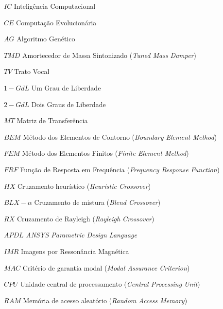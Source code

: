 \begin{siglas}
	\item[$IC$] 	Inteligência Computacional
	\item[$CE$] 	Computação Evolucionária
	\item[$AG$] 	Algoritmo Genético
	\item[$TMD$]	Amortecedor de Massa Sintonizado (\textit{Tuned Mass Damper})
	\item[$TV$]		Trato Vocal
	\item[$1-GdL$]  Um Grau de Liberdade
	\item[$2-GdL$]  Dois Graus de Liberdade
	\item[$MT$] 	Matriz de Transferência
	\item[$BEM$] 	Método dos Elementos de Contorno  (\textit{Boundary Element Method})
	\item[$FEM$] 	Método dos Elementos Finitos (\textit{Finite Element Method})
	\item[$FRF$] 	Função de Resposta em Frequência (\textit{Frequency Response Function})
	\item[$HX$]		Cruzamento heurístico (\textit{Heuristic Crossover})
	\item[$BLX-\alpha$]	Cruzamento de mistura (\textit{Blend Crossover})
	\item[$RX$]		Cruzamento de Rayleigh (\textit{Rayleigh Crossover})
	\item[$APDL$] 	\textit{ANSYS Parametric Design Language}
	\item[$IMR$]	Imagens por Ressonância Magnética
	\item[$MAC$]	Critério de garantia modal (\textit{Modal Assurance Criterion})
	\item[$CPU$] 	Unidade central de processamento (\textit{Central Processing Unit})
	\item[$RAM$] 	Memória de acesso aleatório (\textit{Random Access Memory})
\end{siglas}

